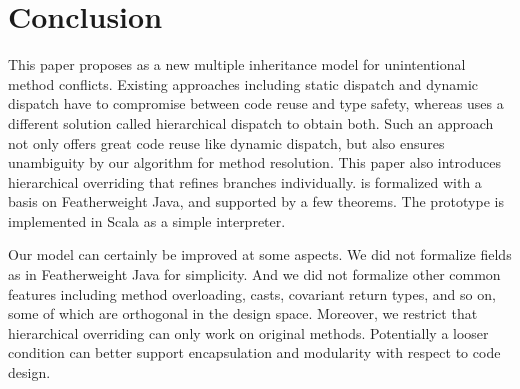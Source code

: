 \section{Conclusion}

This paper proposes \MIM{} as a new multiple inheritance model for unintentional method conflicts.
Existing approaches including static dispatch and dynamic dispatch have to compromise between code reuse
and type safety, whereas \MIM{} uses a different solution called hierarchical dispatch to obtain both.
Such an approach not only offers great code reuse like dynamic dispatch, but also ensures unambiguity by
our algorithm for method resolution. This paper also introduces hierarchical overriding that refines branches individually.
\MIM{} is formalized with a basis on Featherweight Java, and supported
by a few theorems. The prototype is implemented in Scala as a simple interpreter.

Our model can certainly be improved at some aspects. We did not formalize fields as in Featherweight Java for simplicity.
And we did not formalize other common features including
method overloading, casts, covariant return types, and so on, some of which are orthogonal in the design space. Moreover, we restrict that hierarchical overriding can only work on original methods. Potentially a looser condition can better support encapsulation and modularity with respect to code design.